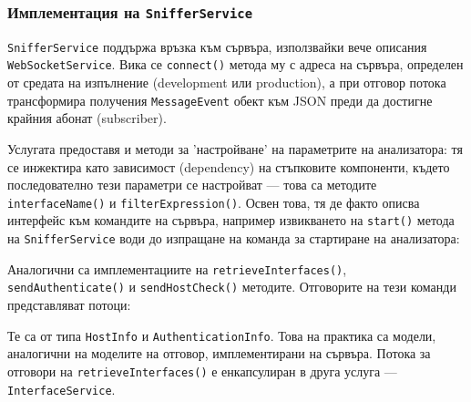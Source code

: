 \documentclass[12pt,a4paper,oneside]{book}
\begin{document}


\subsubsection{Имплементация на \texttt{SnifferService}}

\texttt{SnifferService} поддържа връзка към сървъра, използвайки вече описания
\texttt{WebSocketService}. Вика се \texttt{connect()} метода му с адреса
на сървъра, определен от средата на изпълнение (development или production),
а при отговор потока трансформира получения \texttt{MessageEvent} обект към JSON преди да достигне крайния абонат (subscriber).



Услугата предоставя и методи за 'настройване' на
параметрите на анализатора: тя се инжектира като зависимост (dependency) на
стъпковите компоненти, където последователно тези параметри се настройват --- това
са методите \texttt{interfaceName()} и \texttt{filterExpression()}.
Освен това, тя де факто описва интерфейс към
командите на сървъра, например извикването на \texttt{start()} метода на
\texttt{SnifferService} води до изпращане на команда за стартиране на
анализатора:



Аналогични са имплементациите на \texttt{retrieveInterfaces()}, \texttt{sendAuthenticate()} и
\texttt{sendHostCheck()} методите. Отговорите на тези команди представляват
потоци:



Те са от типа \texttt{HostInfo} и \texttt{AuthenticationInfo}. Това
на практика са модели, аналогични на моделите на отговор, имплементирани на
сървъра. Потока за отговори на \texttt{retrieveInterfaces()} е енкапсулиран в
друга услуга --- \texttt{InterfaceService}.
\end{document}
